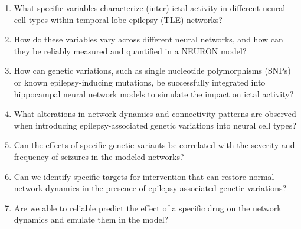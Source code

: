 \begin{enumerate}
    \item What specific variables characterize (inter)-ictal activity in different neural cell types within temporal lobe epilepsy (TLE) networks?
    \item How do these variables vary across different neural networks, and how can they be reliably measured and quantified in a NEURON model?
    \item How can genetic variations, such as single nucleotide polymorphisms (SNPs) or known epilepsy-inducing mutations, be successfully integrated into hippocampal neural network models to simulate the impact on ictal activity?
    \item What alterations in network dynamics and connectivity patterns are observed when introducing epilepsy-associated genetic variations into neural cell types?
    \item Can the effects of specific genetic variants be correlated with the severity and frequency of seizures in the modeled networks?
    \item Can we identify specific targets for intervention that can restore normal network dynamics in the presence of epilepsy-associated genetic variations?
    \item Are we able to reliable predict the effect of a specific drug on the network dynamics and emulate them in the model?
\end{enumerate}